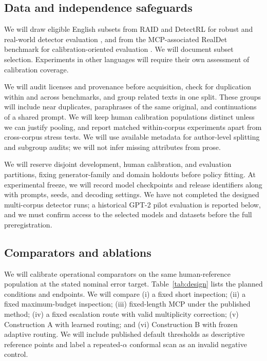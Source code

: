\documentclass[pdflatex,sn-mathphys-num]{sn-jnl}
\begin{document}
\subsection{Data and independence safeguards}

We will draw eligible English subsets from RAID and DetectRL for robust and real-world detector evaluation \citep{dugan2024,wu2024}, and from the MCP-associated RealDet benchmark for calibration-oriented evaluation \citep{zhu2025}. We will document subset selection. Experiments in other languages will require their own assessment of calibration coverage.

We will audit licenses and provenance before acquisition, check for duplication within and across benchmarks, and group related texts in one split. These groups will include near duplicates, paraphrases of the same original, and continuations of a shared prompt. We will keep human calibration populations distinct unless we can justify pooling, and report matched within-corpus experiments apart from cross-corpus stress tests. We will use available metadata for author-level splitting and subgroup audits; we will not infer missing attributes from prose.

We will reserve disjoint development, human calibration, and evaluation partitions, fixing generator-family and domain holdouts before policy fitting. At experimental freeze, we will record model checkpoints and release identifiers along with prompts, seeds, and decoding settings. We have not completed the designed multi-corpus detector runs; a historical GPT-2 pilot evaluation is reported below, and we must confirm access to the selected models and datasets before the full preregistration.

\subsection{Comparators and ablations}

We will calibrate operational comparators on the same human-reference population at the stated nominal error target. Table~\ref{tab:design} lists the planned conditions and endpoints. We will compare (i) a fixed short inspection; (ii) a fixed maximum-budget inspection; (iii) fixed-length MCP under the published method; (iv) a fixed escalation route with valid multiplicity correction; (v) Construction A with learned routing; and (vi) Construction B with frozen adaptive routing. We will include published default thresholds as descriptive reference points and label a repeated-\(\alpha\) conformal scan as an invalid negative control.
\end{document}

